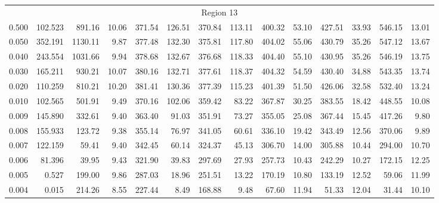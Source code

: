 \begin{tabular}{@{}lrrrrrrrrrrrrr@{}}
\midrule
\multicolumn{14}{c}{Region 13} \\
\cmidrule{1-14}
0.500 & 102.523 & 891.16 & 10.06 & 371.54 & 126.51 & 370.84 & 113.11 & 400.32 & 53.10 & 427.51 & 33.93 & 546.15 & 13.01 \\
0.050 & 352.191 & 1130.11 & 9.87 & 377.48 & 132.30 & 375.81 & 117.80 & 404.02 & 55.06 & 430.79 & 35.26 & 547.12 & 13.67 \\
0.040 & 243.554 & 1031.66 & 9.94 & 378.68 & 132.67 & 376.68 & 118.33 & 404.40 & 55.10 & 430.95 & 35.26 & 546.19 & 13.75 \\
0.030 & 165.211 & 930.21 & 10.07 & 380.16 & 132.71 & 377.61 & 118.37 & 404.32 & 54.59 & 430.40 & 34.88 & 543.35 & 13.74 \\
0.020 & 110.259 & 810.21 & 10.20 & 381.41 & 130.36 & 377.39 & 115.23 & 401.39 & 51.50 & 426.06 & 32.58 & 532.40 & 13.24 \\
0.010 & 102.565 & 501.91 & 9.49 & 370.16 & 102.06 & 359.42 & 83.22 & 367.87 & 30.25 & 383.55 & 18.42 & 448.55 & 10.08 \\
0.009 & 145.890 & 332.61 & 9.40 & 363.40 & 91.03 & 351.91 & 73.27 & 355.05 & 25.08 & 367.44 & 15.45 & 417.26 & 9.80 \\
0.008 & 155.933 & 123.72 & 9.38 & 355.14 & 76.97 & 341.05 & 60.61 & 336.10 & 19.42 & 343.49 & 12.56 & 370.06 & 9.89 \\
0.007 & 122.159 & 59.41 & 9.40 & 342.45 & 60.14 & 324.37 & 45.13 & 306.70 & 14.00 & 305.88 & 10.44 & 294.00 & 10.70 \\
0.006 & 81.396 & 39.95 & 9.43 & 321.90 & 39.83 & 297.69 & 27.93 & 257.73 & 10.43 & 242.29 & 10.27 & 172.15 & 12.25 \\
0.005 & 0.527 & 199.00 & 9.86 & 287.03 & 18.96 & 251.51 & 13.22 & 170.19 & 10.80 & 133.19 & 12.52 & 59.06 & 11.99 \\
0.004 & 0.015 & 214.26 & 8.55 & 227.44 & 8.49 & 168.88 & 9.48 & 67.60 & 11.94 & 51.33 & 12.04 & 31.44 & 10.10 \\

\bottomrule
\end{tabular}

